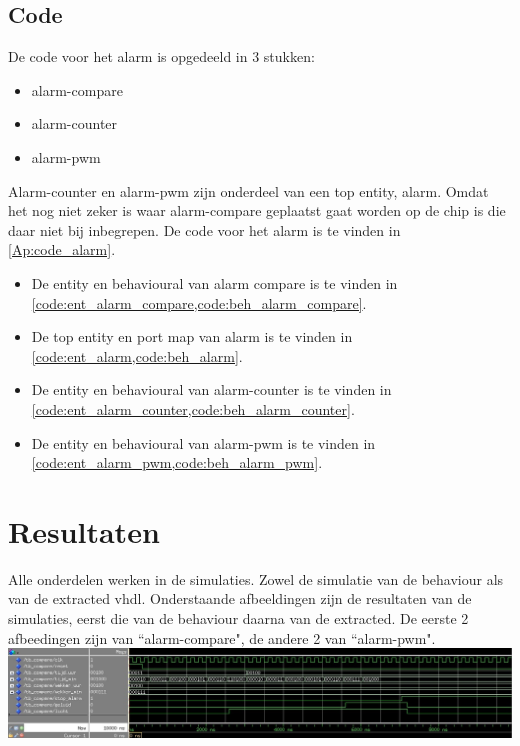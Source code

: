 \subsection{Code}
De code voor het alarm is opgedeeld in 3 stukken:
\begin{itemize}[nolistsep]
\item alarm-compare
\item alarm-counter
\item alarm-pwm
\end{itemize}
Alarm-counter en alarm-pwm zijn onderdeel van een top entity, alarm. Omdat het nog niet zeker is waar alarm-compare geplaatst gaat worden op de chip is die daar niet bij inbegrepen.
De code voor het alarm is te vinden in \cref{Ap:code_alarm}.
\begin{itemize}[nolistsep]
\item De entity en behavioural van alarm compare is te vinden in \cref{code:ent_alarm_compare,code:beh_alarm_compare}.
\item De top entity en port map van alarm is te vinden in \cref{code:ent_alarm,code:beh_alarm}.
\item De entity en behavioural van alarm-counter is te vinden in \cref{code:ent_alarm_counter,code:beh_alarm_counter}.
\item De entity en behavioural van alarm-pwm is te vinden in \cref{code:ent_alarm_pwm,code:beh_alarm_pwm}.
\end{itemize}
\section{Resultaten}
Alle onderdelen werken in de simulaties. Zowel de simulatie van de behaviour als van de extracted vhdl.
Onderstaande afbeeldingen zijn de resultaten van de simulaties, eerst die van de behaviour daarna van de extracted.
De eerste 2 afbeedingen zijn van ``alarm-compare", de andere 2 van ``alarm-pwm".
\\

\includegraphics[width=\textwidth,height=\textheight,keepaspectratio]{Figuren/Alarm/Compare_beh.jpg}


